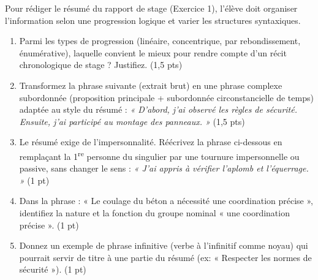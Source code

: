 \documentclass[11pt]{article}
\begin{document}
\begin{exercice}
\label{exo:morpho}
Pour rédiger le résumé du rapport de stage (Exercice 1), l'élève doit organiser l'information selon une progression logique et varier les structures syntaxiques.

\begin{enumerate}
    \item Parmi les types de progression (linéaire, concentrique, par rebondissement, énumérative), laquelle convient le mieux pour rendre compte d'un récit chronologique de stage ? Justifiez. \hfill (1,5 pts)
    \item Transformez la phrase suivante (extrait brut) en une phrase complexe subordonnée (proposition principale + subordonnée circonstancielle de temps) adaptée au style du résumé :
    \textit{« D'abord, j'ai observé les règles de sécurité. Ensuite, j'ai participé au montage des panneaux. »} \hfill (1,5 pts)
    \item Le résumé exige de l'impersonnalité. Réécrivez la phrase ci-dessous en remplaçant la 1\textsuperscript{re} personne du singulier par une tournure impersonnelle ou passive, sans changer le sens :
    \textit{« J'ai appris à vérifier l'aplomb et l'équerrage. »} \hfill (1 pt)
    \item Dans la phrase : « Le coulage du béton a nécessité une coordination précise », identifiez la nature et la fonction du groupe nominal « une coordination précise ». \hfill (1 pt)
    \item Donnez un exemple de phrase infinitive (verbe à l'infinitif comme noyau) qui pourrait servir de titre à une partie du résumé (ex: « Respecter les normes de sécurité »). \hfill (1 pt)
\end{enumerate}
\end{exercice}
\end{document}
